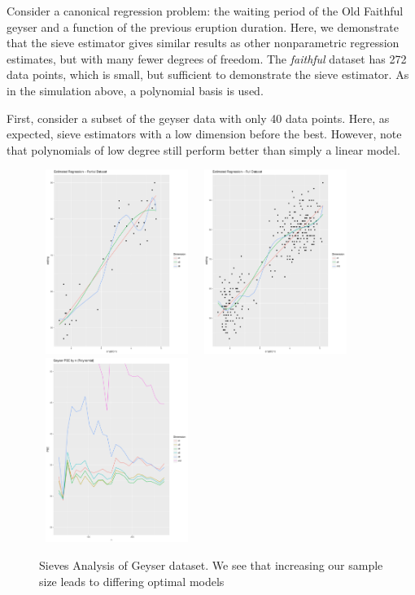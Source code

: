 \documentclass[12pt]{article}  %
\begin{document}
Consider a canonical regression problem: the waiting period of the Old Faithful geyser and a function  of the previous eruption duration.  Here, we demonstrate that the sieve estimator gives similar results as other nonparametric regression estimates, but with many fewer degrees of freedom. The \textit{faithful} dataset has 272 data points, which is small, but sufficient to demonstrate the sieve estimator. As in the simulation above, a polynomial basis is used.

First, consider a subset of the geyser data with only 40 data points.  Here, as expected, sieve estimators with a low dimension before the best. However, note that polynomials of low degree still perform better than simply a linear model.
\begin{figure}[h]
    \centering
    \includegraphics[width=0.45\textwidth, height = 6cm]{Geyser_Small_Data.pdf}
    \includegraphics[width=0.45\textwidth, height = 6cm]{Geyser_Full.pdf}\\
    \includegraphics[width=0.45\textwidth, height = 6cm]{Geyser_PSE.pdf}\\
    \caption{Sieves Analysis of Geyser dataset. We see that increasing our sample size leads to differing optimal models}
    \label{fig:Geyser}{}
\end{figure}
\end{document}
